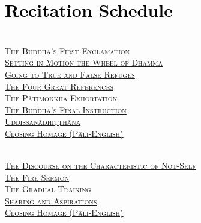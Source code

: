 \section{\textcolor{black}{Recitation Schedule}}
\label{schedule}

\begin{center}

  {\libertinusFont\selectfont\textbf{\textsc{}}}\\

  \textsc{
    The Buddha's First Exclamation \pageref{buddhas-first-exclamation}\\
    \hyperref[wheel-of-dhamma-abridged]{Setting in Motion the Wheel of Dhamma} \pageref{wheel-of-dhamma-abridged}\\
    \hyperref[true-false-refuges]{Going to True and False Refuges} \pageref{true-false-refuges}\\
    \hyperref[four-great-references]{The Four Great References} \pageref{four-great-references}\\
    \hyperref[patimokkha-exhortation]{The Pāṭimokkha Exhortation} \pageref{patimokkha-exhortation}\\
    \hyperref[buddhas-final-instruction]{The Buddha's Final Instruction} \pageref{buddhas-final-instruction}\\
    \hyperref[uddissanadhitthana]{Uddissanādhiṭṭhāna} \pageref{uddissanadhitthana}\\
    \hyperref[closing-homage]{Closing Homage (Pāli-English)}} \pageref{closing-homage}\\

  \bigskip

  {\libertinusFont\selectfont\textbf{\textsc{}}}\\

  \textsc{
    \hyperref[characteristic-of-not-self]{The Discourse on the Characteristic of Not-Self} \pageref{characteristic-of-not-self}\\
    \hyperref[fire-sermon]{The Fire Sermon} \pageref{fire-sermon}\\
    \hyperref[gradual-training]{The Gradual Training} \pageref{gradual-training}\\
    \hyperref[sharing-aspirations]{Sharing and Aspirations} \pageref{sharing-aspirations}\\
    \hyperref[closing-homage]{Closing Homage (Pāli-English)}} \pageref{closing-homage}\\

  \bigskip


\end{center}
